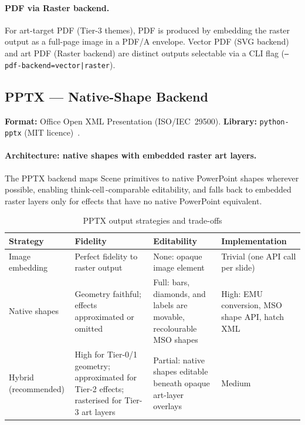 \paragraph{PDF via Raster backend.}
For art-target PDF (Tier-3 themes), PDF is produced by embedding the raster output as a
full-page image in a PDF/A envelope. Vector PDF (SVG backend) and art PDF (Raster backend)
are distinct outputs selectable via a CLI flag (\texttt{--pdf-backend=vector|raster}).

\subsection{PPTX --- Native-Shape Backend}
\label{sec:output-pptx}

\textbf{Format:} Office Open XML Presentation (ISO/IEC~29500).
\textbf{Library:} \texttt{python-pptx} (MIT licence)~\cite{python-pptx}.

\paragraph{Architecture: native shapes with embedded raster art layers.}

The PPTX backend maps Scene primitives to native PowerPoint shapes wherever possible,
enabling think-cell\,\cite{thinkcell}-comparable editability, and falls back to embedded
raster layers only for effects that have no native PowerPoint equivalent.

\begin{table}[h]
\centering
\small
\begin{tabularx}{\textwidth}{lXXX}
\toprule
\textbf{Strategy} & \textbf{Fidelity} & \textbf{Editability} & \textbf{Implementation} \\
\midrule
Image embedding &
  Perfect fidelity to raster output &
  None: opaque image element &
  Trivial (one API call per slide) \\[6pt]
Native shapes &
  Geometry faithful; effects approximated or omitted &
  Full: bars, diamonds, and labels are movable, recolourable MSO shapes &
  High: EMU conversion, MSO shape API, hatch XML \\[6pt]
Hybrid (recommended) &
  High for Tier-0/1 geometry; approximated for Tier-2 effects; rasterised for Tier-3 art layers &
  Partial: native shapes editable beneath opaque art-layer overlays &
  Medium \\
\bottomrule
\end{tabularx}
\caption{PPTX output strategies and trade-offs}
\label{tab:pptx-strategies}
\end{table}


